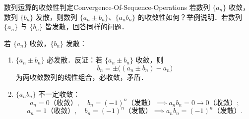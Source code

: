 \begin{problem}{数列运算的收敛性判定}{Convergence-Of-Sequence-Operations}
    若数列 $\{a_n\}$ 收敛，数列 $\{b_n\}$ 发散，则数列 $\{a_n \pm b_n\}$、$\{a_n b_n\}$ 的收敛性如何？举例说明．若数列 $\{a_n\}$ 与 $\{b_n\}$ 皆发散，回答同样的问题．
\end{problem}

\begin{solution}
    若 $\{a_n\}$ 收敛，$\{b_n\}$ 发散：
    \begin{enumerate}
        \item $\{a_n \pm b_n\}$ 必发散．反证：若 $\{a_n \pm b_n\}$ 收敛，则
              \begin{equation}
                  b_n = \pm \bigl( (a_n \pm b_n) - a_n \bigr)
              \end{equation}
              为两收敛数列的线性组合，必收敛，矛盾．
        \item $\{a_n b_n\}$ 不一定收敛：
              \begin{equation}
                  a_n = 0 \text{（收敛）}, \quad b_n = (-1)^n \text{（发散）} \implies a_n b_n = 0 \to 0 \text{（收敛）};
              \end{equation}
              \begin{equation}
                  a_n = 1 \text{（收敛）}, \quad b_n = (-1)^n \text{（发散）} \implies a_n b_n = (-1)^n \text{（发散）}.
              \end{equation}
    \end{enumerate}


\end{solution}
